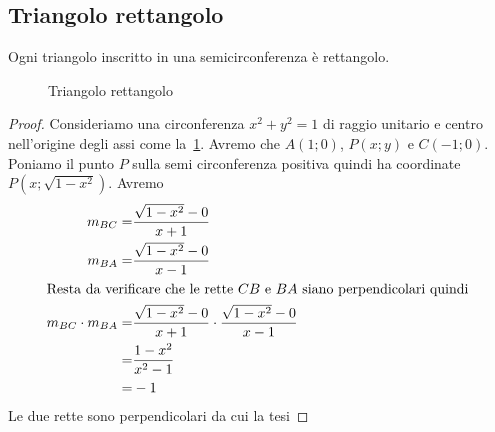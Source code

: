 \subsection{Triangolo rettangolo}
\begin{thm}\label{thm:TriangoloRettangoloSemicirconferenza}
Ogni triangolo inscritto in una semicirconferenza è rettangolo.
\end{thm}
\begin{figure}
	\centering
	
	\caption{Triangolo rettangolo}
	\label{fig:triangolorettangoloinscritto}
\end{figure}
\begin{proof}
Consideriamo una circonferenza $x^2+y^2=1$ di raggio unitario e centro nell'origine degli assi come la~\cref{fig:triangolorettangoloinscritto}. Avremo che $A(1;0)$, $P(x;y)$ e $C(-1;0)$. Poniamo il punto $P$ sulla semi circonferenza positiva quindi ha coordinate $P(x;\sqrt{1-x^2})$. Avremo
\begin{align*}
m_{BC}=&\dfrac{\sqrt{1-x^2}-0}{x+1}\\
m_{BA}=&\dfrac{\sqrt{1-x^2}-0}{x-1}\\
\intertext{Resta da verificare che le rette $CB$ e $BA$ siano perpendicolari quindi }
m_{BC}\cdot m_{BA}=&\dfrac{\sqrt{1-x^2}-0}{x+1}\cdot\dfrac{\sqrt{1-x^2}-0}{x-1}\\
=&\dfrac{1-x^2}{x^2-1}\\
=&-1
\end{align*}
Le due rette sono perpendicolari da cui la tesi
\end{proof}